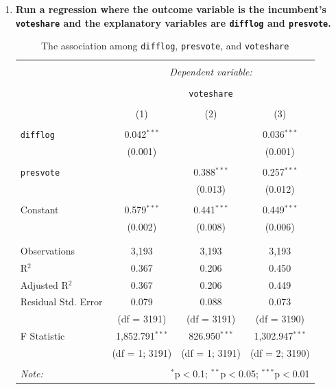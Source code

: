 \documentclass[12pt,letterpaper]{article}
\begin{document}
\begin{enumerate}
	\item \textbf{Run a regression where the outcome variable is the incumbent's \texttt{voteshare} and the explanatory variables are \texttt{difflog} and \texttt{presvote}.}

		

		\begin{table}[!htbp] \centering 
			\caption{The association among \texttt{difflog}, \texttt{presvote}, and \texttt{voteshare}} 
			\label{} 
			\begin{tabular}{@{\extracolsep{5pt}}lccc} 
				\\[-1.8ex]\hline 
				\hline \\[-1.8ex] 
				& \multicolumn{3}{c}{\textit{Dependent variable:}} \\ 
				\cline{2-4} 
				\\[-1.8ex] & \multicolumn{3}{c}{\texttt{voteshare}} \\ 
				\\[-1.8ex] & (1) & (2) & (3)\\ 
				\hline \\[-1.8ex] 
				\texttt{difflog} & 0.042$^{***}$ &  & 0.036$^{***}$ \\ 
				& (0.001) &  & (0.001) \\ 
				& & & \\ 
				\texttt{presvote} &  & 0.388$^{***}$ & 0.257$^{***}$ \\ 
				&  & (0.013) & (0.012) \\ 
				& & & \\ 
				Constant & 0.579$^{***}$ & 0.441$^{***}$ & 0.449$^{***}$ \\ 
				& (0.002) & (0.008) & (0.006) \\ 
				& & & \\ 
				\hline \\[-1.8ex] 
				Observations & 3,193 & 3,193 & 3,193 \\ 
				R$^{2}$ & 0.367 & 0.206 & 0.450 \\ 
				Adjusted R$^{2}$ & 0.367 & 0.206 & 0.449 \\ 
				Residual Std. Error & 0.079 & 0.088 & 0.073 \\ 
				& (df = 3191) & (df = 3191) & (df = 3190) \\
				F Statistic & 1,852.791$^{***}$ & 826.950$^{***}$ & 1,302.947$^{***}$ \\ 
				& (df = 1; 3191) & (df = 1; 3191) & (df = 2; 3190) \\
				\hline 
				\hline \\[-1.8ex] 
				\textit{Note:}  & \multicolumn{3}{r}{$^{*}$p$<$0.1; $^{**}$p$<$0.05; $^{***}$p$<$0.01} \\ 
			\end{tabular} 
		\end{table} 


\end{enumerate}
\end{document}
